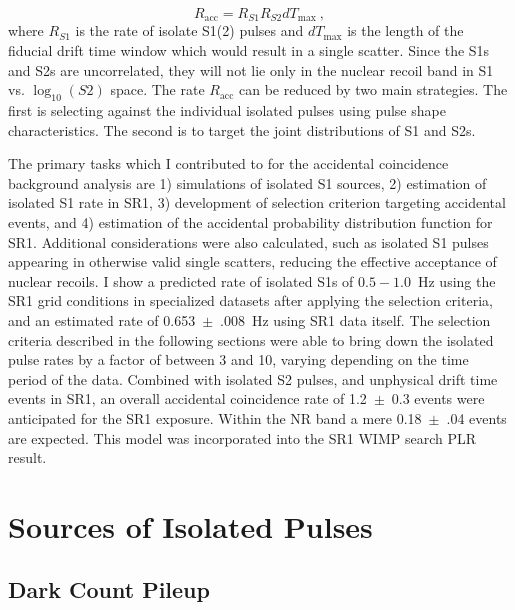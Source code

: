\begin{equation}
    R_{\text{acc}} = R_{S1}R_{S2} dT_{\text{max}}~,
\end{equation}
\noindent
where $R_{S1}$ is the rate of isolate S1(2) pulses and $dT_{\text{max}}$ is the length of the fiducial drift time window which would result in a single scatter.
Since the S1s and S2s are uncorrelated, they will not lie only in the nuclear recoil band in S1 vs. $\log_{10} (S2)$ space.
The rate $R_{\text{acc}}$ can be reduced by two main strategies. 
The first is selecting against the individual isolated pulses using pulse shape characteristics. 
The second is to target the joint distributions of S1 and S2s.

The primary tasks which I contributed to for the accidental coincidence background analysis are 1) simulations of isolated S1 sources, 2) estimation of isolated S1 rate in SR1, 3) development of selection criterion targeting accidental events, and 4) estimation of the accidental probability distribution function for SR1.
Additional considerations were also calculated, such as isolated S1 pulses appearing in otherwise valid single scatters, reducing the effective acceptance of nuclear recoils.
I show a predicted rate of isolated S1s of $0.5-1.0$~Hz using the SR1 grid conditions in specialized datasets after applying the selection criteria, and an estimated rate of 0.653~$\pm$~.008~Hz using SR1 data itself.
The selection criteria described in the following sections were able to bring down the isolated pulse rates by a factor of between 3 and 10, varying depending on the time period of the data. 
Combined with isolated S2 pulses, and unphysical drift time events in SR1, an overall accidental coincidence rate of 1.2~$\pm$~0.3 events were anticipated for the SR1 exposure.
Within the NR band a mere 0.18~$\pm$~.04 events are expected.
This model was incorporated into the SR1 WIMP search PLR result\cite{aalbers_first_2022}.

\section {Sources of Isolated Pulses}

\subsection{Dark Count Pileup}
\label{sec:pileup}

